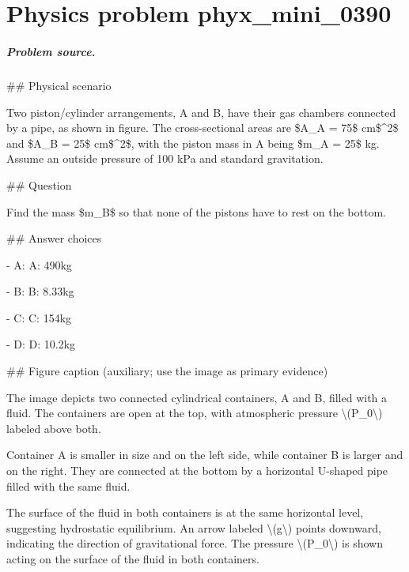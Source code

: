 
\chapter{Physics problem phyx\_mini\_0390}
\label{ch:PhyXMiniProblems_problem_phyx_mini_0390}

\paragraph{Problem source.}
\#\# Physical scenario

Two piston/cylinder arrangements, A and B, have their gas chambers connected by a pipe, as shown in figure. The cross-sectional areas are \$A\_A = 75\$ cm\$\textasciicircum{}2\$ and \$A\_B = 25\$ cm\$\textasciicircum{}2\$, with the piston mass in A being \$m\_A = 25\$ kg. Assume an outside pressure of 100 kPa and standard gravitation.

\#\# Question

Find the mass \$m\_B\$ so that none of the pistons have to rest on the bottom.

\#\# Answer choices

- A: A: 490kg

- B: B: 8.33kg

- C: C: 154kg

- D: D: 10.2kg

\#\# Figure caption (auxiliary; use the image as primary evidence)

The image depicts two connected cylindrical containers, A and B, filled with a fluid. The containers are open at the top, with atmospheric pressure \textbackslash{}(P\_0\textbackslash{}) labeled above both. 

Container A is smaller in size and on the left side, while container B is larger and on the right. They are connected at the bottom by a horizontal U-shaped pipe filled with the same fluid.

The surface of the fluid in both containers is at the same horizontal level, suggesting hydrostatic equilibrium. An arrow labeled \textbackslash{}(g\textbackslash{}) points downward, indicating the direction of gravitational force. The pressure \textbackslash{}(P\_0\textbackslash{}) is shown acting on the surface of the fluid in both containers. 

